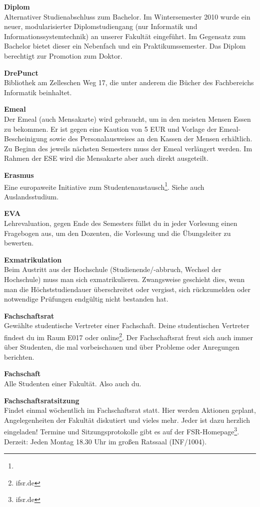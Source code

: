 \textbf{Diplom} \\
Alternativer Studienabschluss zum Bachelor.
Im Wintersemester 2010 wurde ein neuer, modularisierter Diplomstudiengang (nur Informatik und Informationssystemtechnik) an unserer Fakultät eingeführt.
Im Gegensatz zum Bachelor bietet dieser ein Nebenfach und ein Praktikumssemester.
Das Diplom berechtigt zur Promotion zum Doktor.

\textbf{DrePunct} \\
Bibliothek am Zelleschen Weg 17, die unter anderem die Bücher des Fachbereichs Informatik beinhaltet.

\textbf{Emeal} \\
Der Emeal (auch Mensakarte) wird gebraucht, um in den meisten Mensen Essen zu bekommen.
Er ist gegen eine Kaution von 5 EUR und Vorlage der Emeal-Bescheinigung sowie des Personalausweises an den Kassen der Mensen erhältlich.
Zu Beginn des jeweils nächsten Semesters muss der Emeal verlängert werden.
Im Rahmen der ESE wird die Mensakarte aber auch direkt ausgeteilt.

\textbf{Erasmus} \\
Eine europaweite Initiative zum Studentenaustausch\footnote{}.
Siehe auch Auslandsstudium.

\textbf{EVA} \\
Lehrevaluation, gegen Ende des Semesters füllst du in jeder Vorlesung einen Fragebogen aus, um den Dozenten, die Vorlesung und die Übungsleiter zu bewerten.

\textbf{Exmatrikulation} \\
Beim Austritt aus der Hochschule (Studienende/-abbruch, Wechsel der Hochschule) muss man sich exmatrikulieren.
Zwangsweise geschieht dies, wenn man die Höchststudiendauer überschreitet oder vergisst, sich rückzumelden oder notwendige Prüfungen endgültig nicht bestanden hat.

\textbf{Fachschaftsrat} \\
Gewählte studentische Vertreter einer Fachschaft.
Deine studentischen Vertreter findest du im Raum E017 oder online\footnote{ifsr.de}.
Der Fachschaftsrat freut sich auch immer über Studenten, die mal vorbeischauen und über Probleme oder Anregungen berichten.

\textbf{Fachschaft} \\
Alle Studenten einer Fakultät. Also auch du.

\textbf{Fachschaftsratsitzung} \\
Findet einmal wöchentlich im Fachschaftsrat statt.
Hier werden Aktionen geplant, Angelegenheiten der Fakultät diskutiert und vieles mehr.
Jeder ist dazu herzlich eingeladen!
Termine und Sitzungsprotokolle gibt es auf der FSR-Homepage\footnote{ifsr.de}.
Derzeit:
Jeden Montag 18.30 Uhr im großen Ratssaal (INF/1004).


